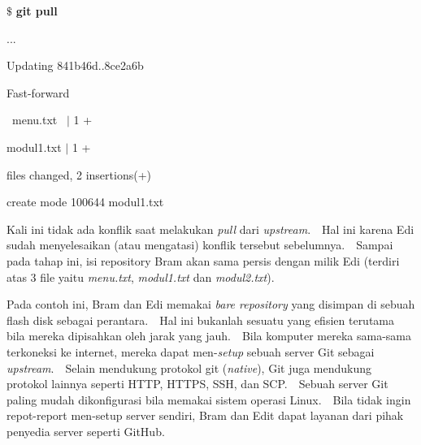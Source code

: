 \vspace{12pt}
\noindent 
 $  \$  $ \textbf{git pull} \par
\noindent 
... \par
\noindent 
Updating 841b46d..8ce2a6b \par
\noindent 
Fast-forward \par
\noindent 
~menu.txt~   $  \vert  $ 1 + \par
\noindent 
 modul1.txt  $  \vert  $ 1 + \par
{} files changed, 2 insertions(+) \par
\noindent 
 create mode 100644 modul1.txt \par
\noindent 
\vspace{12pt}
\noindent 
\vspace{12pt}
\noindent 
\vspace{12pt}
\noindent 
Kali ini tidak ada konflik saat melakukan \textit{pull} dari \textit{upstream}. $  $ $  $ Hal ini karena Edi sudah menyelesaikan (atau mengatasi) konflik tersebut sebelumnya. $  $ $  $ Sampai pada tahap ini, isi repository Bram akan sama persis dengan milik Edi (terdiri atas 3 file yaitu \textit{menu.txt}, \textit{modul1.txt} dan \textit{modul2.txt}). \par
\vspace{12pt}
\noindent 
Pada contoh ini, Bram dan Edi memakai \textit{bare repository} yang disimpan di sebuah flash disk sebagai perantara. $  $ $  $ Hal ini bukanlah sesuatu yang efisien terutama bila mereka dipisahkan oleh jarak yang jauh. $  $ $  $ Bila komputer mereka sama-sama terkoneksi ke internet, mereka dapat men-\textit{setup} sebuah server Git sebagai \textit{upstream}. $  $ $  $ Selain mendukung protokol git (\textit{native}), Git juga mendukung protokol lainnya seperti HTTP, HTTPS, SSH, dan SCP. $  $ $  $ Sebuah server Git paling mudah dikonfigurasi bila memakai sistem operasi Linux. $  $ $  $ Bila tidak ingin repot-report men-setup server sendiri, Bram dan Edit dapat layanan dari pihak penyedia server seperti GitHub. \par
\vspace{12pt}

